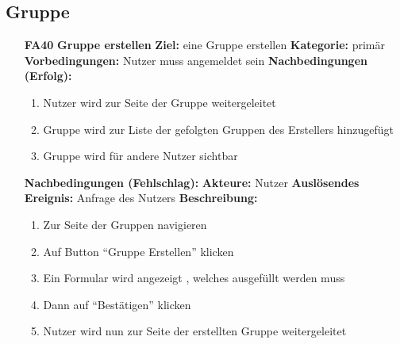 \documentclass[parskip=full]{scrartcl}
\begin{document}
		\subsection{Gruppe}
		\begin{itemize}[nosep]
			\item[\textbf{FA40}]\textbf{Gruppe erstellen}
			\newline \textbf{Ziel:} eine Gruppe erstellen
			\newline \textbf{Kategorie:} primär
			\newline \textbf{Vorbedingungen:} Nutzer muss angemeldet sein
			\newline \textbf{Nachbedingungen (Erfolg):} 
			\begin{enumerate}[nosep]
				\item Nutzer wird zur Seite der Gruppe weitergeleitet
				\item Gruppe wird zur Liste der gefolgten Gruppen des Erstellers hinzugefügt
				\item Gruppe wird für andere Nutzer sichtbar
			\end{enumerate}
			\textbf{Nachbedingungen (Fehlschlag):}
			\newline \textbf{Akteure:} Nutzer
			\newline \textbf{Auslösendes Ereignis:} Anfrage des Nutzers
			\newline \textbf{Beschreibung:}
			\begin{enumerate}[nosep]
				\item Zur Seite der Gruppen navigieren
				\item Auf Button “Gruppe Erstellen” klicken
				\item Ein Formular wird angezeigt , welches ausgefüllt werden muss
				\item Dann auf “Bestätigen” klicken
				\item Nutzer wird nun zur Seite der erstellten Gruppe weitergeleitet\\
			\end{enumerate}
			

\end{itemize}
\end{document}
